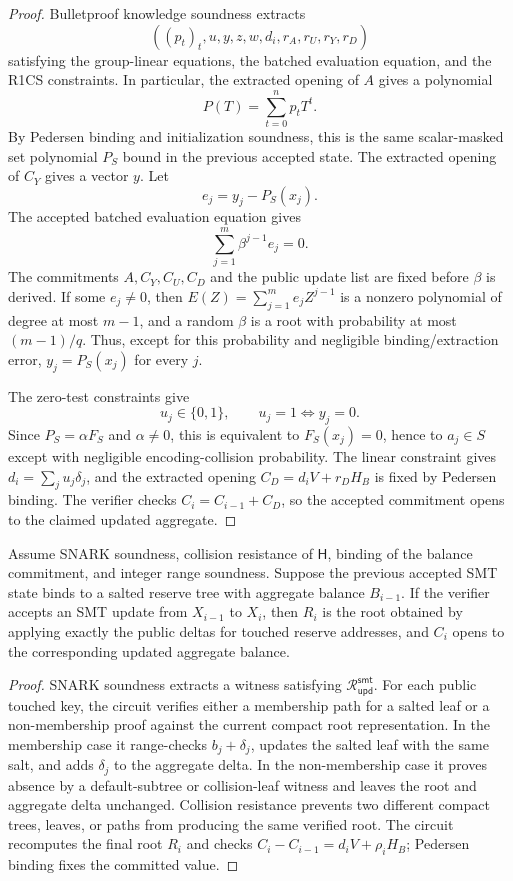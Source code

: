 \documentclass[runningheads]{llncs}
\newcommand{\CRH}{\mathsf{H}}
\newcommand{\Rel}{\mathcal{R}}
\begin{document}
\begin{proof}
Bulletproof knowledge soundness extracts
\[
        ((p_t)_t,u,y,z,w,d_i,r_A,r_U,r_Y,r_D)
\]
satisfying the group-linear equations, the batched evaluation equation, and the R1CS constraints.  In particular, the extracted opening of \(A\) gives a polynomial
\[
        P(T)=\sum_{t=0}^np_tT^t .
\]
By Pedersen binding and initialization soundness, this is the same scalar-masked set polynomial \(P_S\) bound in the previous accepted state.  The extracted opening of \(C_Y\) gives a vector \(y\).  Let
\[
        e_j=y_j-P_S(x_j).
\]
The accepted batched evaluation equation gives
\[
        \sum_{j=1}^m\beta^{j-1}e_j=0.
\]
The commitments \(A,C_Y,C_U,C_D\) and the public update list are fixed before \(\beta\) is derived.  If some \(e_j\ne0\), then \(E(Z)=\sum_{j=1}^me_jZ^{j-1}\) is a nonzero polynomial of degree at most \(m-1\), and a random \(\beta\) is a root with probability at most \((m-1)/q\).  Thus, except for this probability and negligible binding/extraction error, \(y_j=P_S(x_j)\) for every \(j\).

The zero-test constraints give
\[
        u_j\in\{0,1\},\qquad u_j=1 \Longleftrightarrow y_j=0 .
\]
Since \(P_S=\alpha F_S\) and \(\alpha\ne0\), this is equivalent to \(F_S(x_j)=0\), hence to \(a_j\in S\) except with negligible encoding-collision probability.  The linear constraint gives \(d_i=\sum_j u_j\delta_j\), and the extracted opening \(C_D=d_iV+r_DH_B\) is fixed by Pedersen binding.  The verifier checks \(C_i=C_{i-1}+C_D\), so the accepted commitment opens to the claimed updated aggregate.
\end{proof}

\begin{theorem}\label{thm:smt-update-sound}
Assume SNARK soundness, collision resistance of \(\CRH\), binding of the balance commitment, and integer range soundness.  Suppose the previous accepted SMT state binds to a salted reserve tree with aggregate balance \(B_{i-1}\).  If the verifier accepts an SMT update from \(X_{i-1}\) to \(X_i\), then \(R_i\) is the root obtained by applying exactly the public deltas for touched reserve addresses, and \(C_i\) opens to the corresponding updated aggregate balance.
\end{theorem}

\begin{proof}
SNARK soundness extracts a witness satisfying \(\Rel_{\mathsf{upd}}^{\mathsf{smt}}\).  For each public touched key, the circuit verifies either a membership path for a salted leaf or a non-membership proof against the current compact root representation.  In the membership case it range-checks \(b_j+\delta_j\), updates the salted leaf with the same salt, and adds \(\delta_j\) to the aggregate delta.  In the non-membership case it proves absence by a default-subtree or collision-leaf witness and leaves the root and aggregate delta unchanged.  Collision resistance prevents two different compact trees, leaves, or paths from producing the same verified root.  The circuit recomputes the final root \(R_i\) and checks \(C_i-C_{i-1}=d_iV+\rho_iH_B\); Pedersen binding fixes the committed value.
\end{proof}
\end{document}
